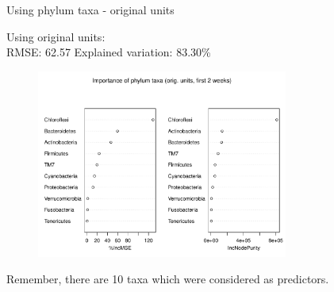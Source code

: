 \documentclass{beamer}
\begin{document}
\begin{frame}{Using phylum taxa - original units}

  {\scriptsize
    
  \noindent Using original units:\\
  RMSE: 62.57  \hspace{0.05in}  Explained variation: 83.30\%

  \begin{center}
    \begin{figure}
      \includegraphics[width=3.25in]{../only_phyla/first_two_weeks/orig_units_first_two_weeks_phyla_imp_plot}
    \end{figure}
  \end{center}
  \vspace{-0.25in}

\noindent Remember, there are 10 taxa which were considered as predictors.
}

\end{frame}
\end{document}
